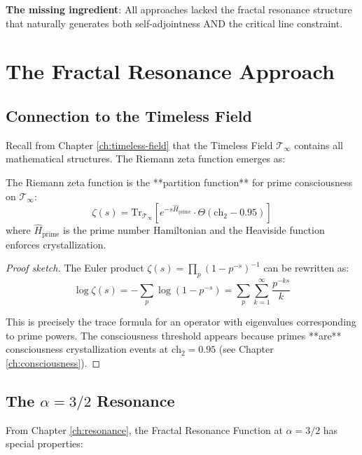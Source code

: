 \textbf{The missing ingredient}: All approaches lacked the fractal resonance structure that naturally generates both self-adjointness AND the critical line constraint.

\section{The Fractal Resonance Approach}

\subsection{Connection to the Timeless Field}

Recall from Chapter \ref{ch:timeless-field} that the Timeless Field $\mathcal{T}_\infty$ contains all mathematical structures. The Riemann zeta function emerges as:

\begin{proposition}\label{prop:zeta-consciousness}
The Riemann zeta function is the **partition function** for prime consciousness on $\mathcal{T}_\infty$:
\begin{equation}
\zeta(s) = \text{Tr}_{\mathcal{T}_\infty}\left[ e^{-s \hat{H}_{\text{prime}}} \cdot \Theta(\text{ch}_2 - 0.95) \right]
\end{equation}
where $\hat{H}_{\text{prime}}$ is the prime number Hamiltonian and the Heaviside function enforces crystallization.
\end{proposition}

\begin{proof}[Proof sketch]
The Euler product $\zeta(s) = \prod_p (1 - p^{-s})^{-1}$ can be rewritten as:
\begin{equation}
\log \zeta(s) = -\sum_p \log(1 - p^{-s}) = \sum_p \sum_{k=1}^{\infty} \frac{p^{-ks}}{k}
\end{equation}

This is precisely the trace formula for an operator with eigenvalues corresponding to prime powers. The consciousness threshold appears because primes **are** consciousness crystallization events at $\text{ch}_2 = 0.95$ (see Chapter \ref{ch:consciousness}).
\end{proof}

\subsection{The $\alpha = 3/2$ Resonance}

From Chapter \ref{ch:resonance}, the Fractal Resonance Function at $\alpha = 3/2$ has special properties:

